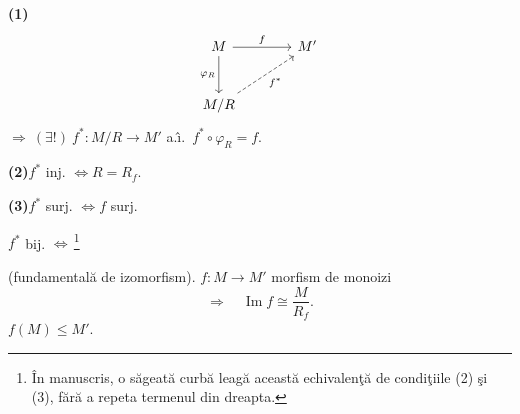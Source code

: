 \bigskip
\noindent\textbf{(1)}
\[
\begin{tikzcd}[column sep=large,row sep=large]
M \arrow[r,"f"] \arrow[d,"\varphi_R"'] & M' \\
M/R \arrow[ur,dashed,"f^{*}"'] &
\end{tikzcd}
\]
\noindent $\Longrightarrow\ (\exists!)\ f^{*}:M/R\longrightarrow M'$ a.\^{\i}.\
$f^{*}\circ\varphi_R=f$.

\bigskip
\noindent\textbf{(2)}\quad $f^{*}$ inj. $\Longleftrightarrow R=R_f$.

\medskip
\noindent\textbf{(3)}\quad $f^{*}$ surj. $\Longleftrightarrow f$ surj.

\medskip
\noindent $f^{*}$ bij. $\Longleftrightarrow$\,\footnote{\^{I}n manuscris, o s\u{a}geat\u{a} curb\u{a} leag\u{a} aceast\u{a} echivalen\c{t}\u{a} de condi\c{t}iile (2) \c{s}i (3), f\u{a}r\u{a} a repeta termenul din dreapta.}

\bigskip
\noindent{}\quad (fundamental\u{a} de izomorfism).\quad
$f:M\longrightarrow M'$ morfism de monoizi
\[
\Longrightarrow\quad \operatorname{Im} f\cong\frac{M}{R_f}.
\]
\noindent\hfill $f(M)\leq M'$.

